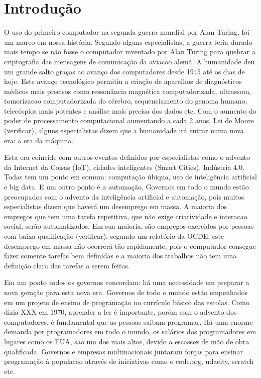 \chapter{Introdução}
\label{cap:introducao}

O uso do primeiro computador na segunda guerra mundial por Alan Turing, foi um marco em nossa história. Segundo alguns especialistas, a guerra teria durado mais tempo se não fosse o computador inventado por Alan Turing para quebrar a criptografia das mensagens de comunicação da aviacao alemã. A humanidade deu um grande salto graças ao avanço dos computadores desde 1945 até os dias de hoje. Este avanço tecnológico permitiu a criação de aparelhos de diagnósticos médicos mais precisos como ressonância magnética computadorizada, ultrassom, tomorizacao computadorizada do cérebro, sequenciamento do genoma humano, telecóspios mais potentes e análise mais precisa dos dados etc. Com o aumento do poder de processamento computacional aumentando a cada 2 anos, Lei de Moore (verificar), alguns especialistas dizem que a humanidade irá entrar numa nova era: a era da máquina. 

Esta era coincide com outros eventos definidos por especialistas como o advento da Internet da Coisas (IoT), cidades inteligentes (Smart Cities), Indústria 4.0. Todas tem um ponto em comum: computação úbiqua, uso de inteligência artificial e big data. E um outro ponto é a automação. Governos em todo o mundo estão preocupados com o advento da inteligência artificial e automação, pois muitos especialistas dizem que haverá um desemprego em massa. A maioria dos empregos que tem uma tarefa repetitiva, que não exige criatividade e interacao social, serão automatizados. Em sua maioria, são empregos exercidos por pessoas com baixa qualificação (verificar). segundo um relatório da OCDE, este desemprego em massa não ocorrerá tão rapidamente, pois o computador consegue fazer somente tarefas bem definidas e a maioria dos trabalhos não tem uma definição clara das tarefas a serem feitas. 

Em um ponto todos os governos concordam: há uma necessidade em preparar a nova geração para esta nova era. Governos de todo o mundo estão empenhados em um projeto de ensino de programação no currículo básico das escolas. Como dizia XXX em 1970, aprender a ler é importante, porém com o advento dos computadores, é fundamental que as pessoas saibam programar. Há uma enorme demanda por programadores em todo o mundo, os salários dos programadores em lugares como os EUA, sao um dos mais altos, devido a escassez de mão de obra qualificada. Governos e empresas multinacionais juntaram forças para ensinar programação à populacao através de iniciativas como o code.org, udacity, scratch etc.

